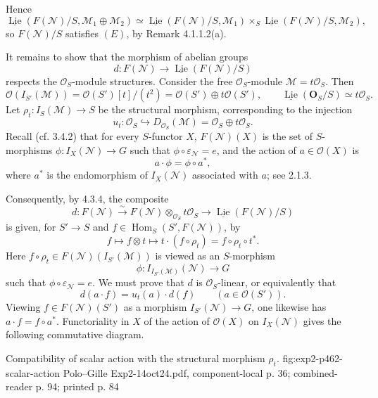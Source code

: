 Hence
\begin{equation*}
 \underline{\operatorname{Lie}}
   (F(\mathcal N)/S,\mathcal M_1\oplus\mathcal M_2)
 \simeq
 \underline{\operatorname{Lie}}(F(\mathcal N)/S,\mathcal M_1)
 \times_S
 \underline{\operatorname{Lie}}(F(\mathcal N)/S,\mathcal M_2),
 \tag{2}
\end{equation*}
so \(F(\mathcal N)/S\) satisfies \((E)\), by Remark 4.1.1.2(a).

It remains to show that the morphism of abelian groups
\[
 d:F(\mathcal N)\longrightarrow
 \underline{\operatorname{Lie}}(F(\mathcal N)/S)
\]
respects the \(\mathcal O_S\)-module structures. Consider the free
\(\mathcal O_S\)-module \(\mathcal M=t\mathcal O_S\). Then
\[
 \mathcal O(I_{S'}(\mathcal M))
 =\mathcal O(S')[t]/(t^2)
 =\mathcal O(S')\oplus t\mathcal O(S'),
 \qquad
 \underline{\operatorname{Lie}}(\mathbf O_S/S)\simeq t\mathcal O_S.
\]
Let \(\rho_t:I_S(\mathcal M)\to S\) be the structural morphism,
corresponding to the injection
\[
 u_t:\mathcal O_S\hookrightarrow
 D_{\mathcal O_S}(\mathcal M)
 =\mathcal O_S\oplus t\mathcal O_S.
\]
Recall (cf. 3.4.2) that for every \(S\)-functor \(X\),
\(F(\mathcal N)(X)\) is the set of \(S\)-morphisms
\(\phi:I_X(\mathcal N)\to G\) such that
\(\phi\circ\varepsilon_{\mathcal N}=e\), and the action of
\(a\in\mathcal O(X)\) is
\[
 a\cdot\phi=\phi\circ a^*,
\]
where \(a^*\) is the endomorphism of \(I_X(\mathcal N)\) associated
with \(a\); see 2.1.3.

Consequently, by 4.3.4, the composite
\[
 d:F(\mathcal N)\xrightarrow{\sim}
 F(\mathcal N)\otimes_{\mathcal O_S}t\mathcal O_S
 \longrightarrow
 \underline{\operatorname{Lie}}(F(\mathcal N)/S)
\]
is given, for \(S'\to S\) and
\(f\in\operatorname{Hom}_S(S',F(\mathcal N))\), by
\[
 f\longmapsto f\otimes t
 \longmapsto t\cdot(f\circ\rho_t)
 =f\circ\rho_t\circ t^*.
\]
Here \(f\circ\rho_t\in F(\mathcal N)(I_{S'}(\mathcal M))\) is viewed
as an \(S\)-morphism
\[
 \phi:I_{I_{S'}(\mathcal M)}(\mathcal N)\longrightarrow G
\]
such that \(\phi\circ\varepsilon_{\mathcal N}=e\). We must prove that
\(d\) is \(\mathcal O_S\)-linear, or equivalently that
\[
 d(a\cdot f)=u_t(a)\cdot d(f)
 \qquad(a\in\mathcal O(S')).
\]
Viewing \(f\in F(\mathcal N)(S')\) as a morphism
\(I_{S'}(\mathcal N)\to G\), one likewise has
\(a\cdot f=f\circ a^*\). Functoriality in \(X\) of the action of
\(\mathcal O(X)\) on \(I_X(\mathcal N)\) gives the following
commutative diagram.

  {Compatibility of scalar action with the structural morphism \(\rho_t\).}
  {fig:exp2-p462-scalar-action}
  {Polo--Gille Exp2-14oct24.pdf, component-local p. 36; combined-reader p. 94; printed p. 84}

